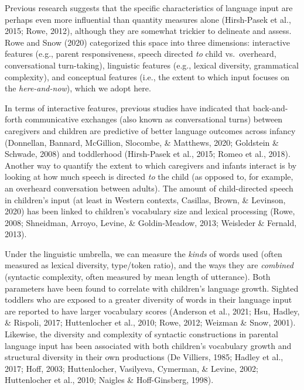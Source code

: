 \documentclass[
  man]{apa6}
\begin{document}
Previous research suggests that the specific characteristics of language input are perhaps even more influential than quantity measures alone (Hirsh-Pasek et al., 2015; Rowe, 2012), although they are somewhat trickier to delineate and assess. Rowe and Snow (2020) categorized this space into three dimensions: interactive features (e.g., parent responsiveness, speech directed \emph{to} child vs.~overheard, conversational turn-taking), linguistic features (e.g., lexical diversity, grammatical complexity), and conceptual features (i.e., the extent to which input focuses on the \emph{here-and-now}), which we adopt here.

In terms of interactive features, previous studies have indicated that back-and-forth communicative exchanges (also known as conversational turns) between caregivers and children are predictive of better language outcomes across infancy (Donnellan, Bannard, McGillion, Slocombe, \& Matthews, 2020; Goldstein \& Schwade, 2008) and toddlerhood (Hirsh-Pasek et al., 2015; Romeo et al., 2018). Another way to quantify the extent to which caregivers and infants interact is by looking at how much speech is directed \emph{to} the child (as opposed to, for example, an overheard conversation between adults). The amount of child-directed speech in children's input (at least in Western contexts, Casillas, Brown, \& Levinson, 2020) has been linked to children's vocabulary size and lexical processing (Rowe, 2008; Shneidman, Arroyo, Levine, \& Goldin-Meadow, 2013; Weisleder \& Fernald, 2013).

Under the linguistic umbrella, we can measure the \emph{kinds} of words used (often measured as lexical diversity, type/token ratio), and the ways they are \emph{combined} (syntactic complexity, often measured by mean length of utterance). Both parameters have been found to correlate with children's language growth. Sighted toddlers who are exposed to a greater diversity of words in their language input are reported to have larger vocabulary scores (Anderson et al., 2021; Hsu, Hadley, \& Rispoli, 2017; Huttenlocher et al., 2010; Rowe, 2012; Weizman \& Snow, 2001). Likewise, the diversity and complexity of syntactic constructions in parental language input has been associated with both children's vocabulary growth and structural diversity in their own productions (De Villiers, 1985; Hadley et al., 2017; Hoff, 2003; Huttenlocher, Vasilyeva, Cymerman, \& Levine, 2002; Huttenlocher et al., 2010; Naigles \& Hoff-Ginsberg, 1998).
\end{document}
